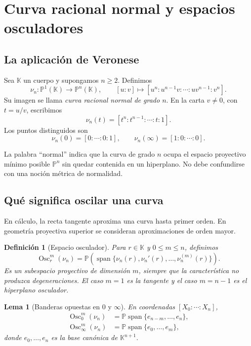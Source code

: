 \documentclass[11pt,oneside]{scrartcl}
\theoremstyle{plainblue}
\newtheorem{lemma}[theorem]{Lema}
\theoremstyle{definitionblue}
\newtheorem{definition}[theorem]{Definición}
\theoremstyle{remarkgray}
\newcommand{\KK}{\mathbb{K}}
\newcommand{\PP}{\mathbb{P}}
\newcommand{\Osc}{\operatorname{Osc}}
\newcommand{\Span}{\operatorname{span}}
\begin{document}
\section{Curva racional normal y espacios osculadores}

\subsection{La aplicación de Veronese}

Sea \(\KK\) un cuerpo y supongamos \(n\ge2\). Definimos
\begin{equation}\label{eq:veronese}
\nu_n:\PP^1(\KK)\longrightarrow\PP^n(\KK),
\qquad
[u:v]\longmapsto[u^n:u^{n-1}v:\cdots:uv^{n-1}:v^n].
\end{equation}
Su imagen se llama \emph{curva racional normal de grado \(n\)}. En la carta
\(v\ne0\), con \(t=u/v\), escribimos
\[
\nu_n(t)=[t^n:t^{n-1}:\cdots:t:1].
\]
Los puntos distinguidos son
\[
\nu_n(0)=[0:\cdots:0:1],
\qquad
\nu_n(\infty)=[1:0:\cdots:0].
\]

La palabra ``normal'' indica que la curva de grado \(n\) ocupa el espacio proyectivo
mínimo posible \(\PP^n\) sin quedar contenida en un hiperplano. No debe confundirse
con una noción métrica de normalidad.

\subsection{Qué significa oscilar una curva}

En cálculo, la recta tangente aproxima una curva hasta primer orden. En geometría
proyectiva superior se consideran aproximaciones de orden mayor.

\begin{definition}[Espacio osculador]
Para \(r\in\KK\) y \(0\le m\le n\), definimos
\[
\Osc_r^m(\nu_n)
=\PP\left(\Span\{\nu_n(r),\nu_n'(r),\dots,\nu_n^{(m)}(r)\}\right).
\]
Es un subespacio proyectivo de dimensión \(m\), siempre que la característica no
produzca degeneraciones. El caso \(m=1\) es la tangente y el caso \(m=n-1\) es el
hiperplano osculador.
\end{definition}

\begin{lemma}[Banderas opuestas en \(0\) y \(\infty\)]\label{lem:flags}
En coordenadas \([X_0:\cdots:X_n]\),
\begin{align}
\Osc_0^m(\nu_n)&=\PP\Span\{e_{n-m},\dots,e_n\},\label{eq:osc0}\\
\Osc_\infty^m(\nu_n)&=\PP\Span\{e_0,\dots,e_m\},\label{eq:oscinf}
\end{align}
donde \(e_0,\dots,e_n\) es la base canónica de \(\KK^{n+1}\).
\end{lemma}
\end{document}

